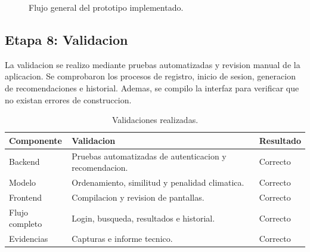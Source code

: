 \documentclass[12pt,a4paper]{article}
\begin{document}
\begin{figure}[H]
\centering
{}
\caption{Flujo general del prototipo implementado.}
\label{fig:flujo}
\end{figure}

\subsection{Etapa 8: Validacion}
La validacion se realizo mediante pruebas automatizadas y revision manual de la aplicacion. Se comprobaron los procesos de registro, inicio de sesion, generacion de recomendaciones e historial. Ademas, se compilo la interfaz para verificar que no existan errores de construccion.

\begin{table}[H]
\centering
\caption{Validaciones realizadas.}
\label{tab:validacion}
\begin{tabular}{p{4cm}p{7cm}p{2cm}}
\toprule
Componente & Validacion & Resultado \\
\midrule
Backend & Pruebas automatizadas de autenticacion y recomendacion. & Correcto \\
Modelo & Ordenamiento, similitud y penalidad climatica. & Correcto \\
Frontend & Compilacion y revision de pantallas. & Correcto \\
Flujo completo & Login, busqueda, resultados e historial. & Correcto \\
Evidencias & Capturas e informe tecnico. & Correcto \\
\bottomrule
\end{tabular}
\end{table}
\end{document}
